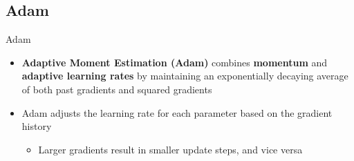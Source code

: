 \documentclass[serif, aspectratio=169]{beamer}
\begin{document}

\subsection{Adam}
\begin{frame}{Adam}
    \begin{itemize}
        \item \textbf{Adaptive Moment Estimation (Adam)} combines \textbf{momentum} and \textbf{adaptive learning rates} by maintaining an exponentially decaying average of both past gradients and squared gradients
        \item Adam adjusts the learning rate for each parameter based on the gradient history
        \begin{itemize}
            \item Larger gradients result in smaller update steps, and vice versa
        \end{itemize}
    \end{itemize}
\end{frame}
\end{document}
